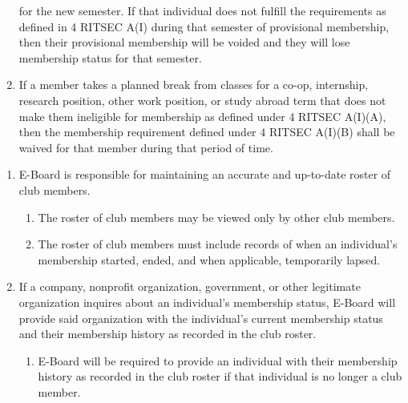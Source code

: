 \begin{enumerate}
    for the new semester. If that individual does not fulfill the requirements
    as defined in 4 RITSEC A(I) during that semester of provisional
    membership, then their provisional membership will be voided and they will
    lose membership status for that semester.
  \item If a member takes a planned break from classes for a co-op, internship,
    research position, other work position, or study abroad term that does not
    make them ineligible for membership as defined under 4 RITSEC A(I)(A),
    then the membership requirement defined under 4 RITSEC A(I)(B) shall be
    waived for that member during that period of time.
\end{enumerate}


\begin{enumerate}
  \item E-Board is responsible for maintaining an accurate and up-to-date
    roster of club members.
  \begin{enumerate}
    \item The roster of club members may be viewed only by other club members.
    \item The roster of club members must include records of when an
      individual's membership started, ended, and when applicable, temporarily
      lapsed.
  \end{enumerate}
  \item If a company, nonprofit organization, government, or other legitimate
    organization inquires about an individual's membership status, E-Board will
    provide said organization with the individual's current membership status
    and their membership history as recorded in the club roster.
  \begin{enumerate}
    \item E-Board will be required to provide an individual with their
      membership history as recorded in the club roster if that individual is
      no longer a club member.
  \end{enumerate}
\end{enumerate}
